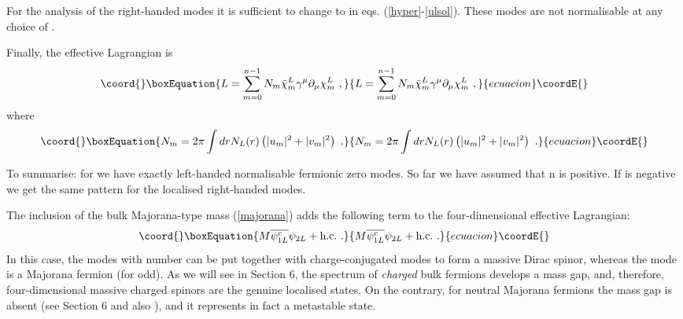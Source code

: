 \documentclass[a4paper,12pt]{article}
\begin{document}
For the analysis of the right-handed modes it is sufficient to change
\coordHE{} to \coordHE{} in eqs. (\ref{hyper}-\ref{ulsol}). These modes are not
normalisable at any choice of \coordHE{}. 

Finally, the effective Lagrangian is
\begin{equation}\coord{}\boxEquation{
L= \sum_{m=0}^{n-1} N_m\bar\chi_m^L\gamma^\mu\partial_\mu\chi_m^L~,
\label{ll}
}{
L= \sum_{m=0}^{n-1} N_m\bar\chi_m^L\gamma^\mu\partial_\mu\chi_m^L~,
}{ecuacion}\coordE{}\end{equation}
where
\begin{equation}\coord{}\boxEquation{
N_m = 2 \pi \int dr N_L(r)\left(|u_m|^2+|v_m|^2\right)~.
\label{nm}
}{
N_m = 2 \pi \int dr N_L(r)\left(|u_m|^2+|v_m|^2\right)~.
}{ecuacion}\coordE{}\end{equation}

To summarise: for \coordHE{} we have exactly \coordHE{} left-handed
normalisable fermionic zero modes.  So far we have assumed that n is
positive. If \coordHE{} is negative we get the same pattern for the
localised right-handed modes.

The inclusion of the bulk Majorana-type mass (\ref{majorana}) adds the
following term to the four-dimensional effective Lagrangian:
\begin{equation}\coord{}\boxEquation{
M {\overline{\psi_{1L}^c}}\psi_{2L} + \mbox{h.c.}~.
}{
M {\overline{\psi_{1L}^c}}\psi_{2L} + \mbox{h.c.}~.
}{ecuacion}\coordE{}\end{equation}
In this case, the modes with number \coordHE{} can be put together with 
charge-conjugated modes \coordHE{} to form a massive Dirac spinor,
whereas the mode \coordHE{} is a Majorana fermion (for \coordHE{}
odd). As we will see in Section 6, the spectrum of {\it charged} bulk
fermions develops a mass gap, and, therefore, four-dimensional 
massive charged spinors are the genuine localised states. On the
contrary, for neutral Majorana fermions the mass gap is absent (see
Section 6 and also \cite{Dubovsky:2000am}), and it represents in fact
a metastable state.

\end{document}
